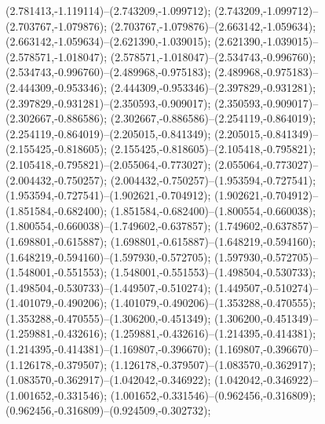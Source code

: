  (2.781413,-1.119114)--(2.743209,-1.099712);
 (2.743209,-1.099712)--(2.703767,-1.079876);
 (2.703767,-1.079876)--(2.663142,-1.059634);
 (2.663142,-1.059634)--(2.621390,-1.039015);
 (2.621390,-1.039015)--(2.578571,-1.018047);
 (2.578571,-1.018047)--(2.534743,-0.996760);
 (2.534743,-0.996760)--(2.489968,-0.975183);
 (2.489968,-0.975183)--(2.444309,-0.953346);
 (2.444309,-0.953346)--(2.397829,-0.931281);
 (2.397829,-0.931281)--(2.350593,-0.909017);
 (2.350593,-0.909017)--(2.302667,-0.886586);
 (2.302667,-0.886586)--(2.254119,-0.864019);
 (2.254119,-0.864019)--(2.205015,-0.841349);
 (2.205015,-0.841349)--(2.155425,-0.818605);
 (2.155425,-0.818605)--(2.105418,-0.795821);
 (2.105418,-0.795821)--(2.055064,-0.773027);
 (2.055064,-0.773027)--(2.004432,-0.750257);
 (2.004432,-0.750257)--(1.953594,-0.727541);
 (1.953594,-0.727541)--(1.902621,-0.704912);
 (1.902621,-0.704912)--(1.851584,-0.682400);
 (1.851584,-0.682400)--(1.800554,-0.660038);
 (1.800554,-0.660038)--(1.749602,-0.637857);
 (1.749602,-0.637857)--(1.698801,-0.615887);
 (1.698801,-0.615887)--(1.648219,-0.594160);
 (1.648219,-0.594160)--(1.597930,-0.572705);
 (1.597930,-0.572705)--(1.548001,-0.551553);
 (1.548001,-0.551553)--(1.498504,-0.530733);
 (1.498504,-0.530733)--(1.449507,-0.510274);
 (1.449507,-0.510274)--(1.401079,-0.490206);
 (1.401079,-0.490206)--(1.353288,-0.470555);
 (1.353288,-0.470555)--(1.306200,-0.451349);
 (1.306200,-0.451349)--(1.259881,-0.432616);
 (1.259881,-0.432616)--(1.214395,-0.414381);
 (1.214395,-0.414381)--(1.169807,-0.396670);
 (1.169807,-0.396670)--(1.126178,-0.379507);
 (1.126178,-0.379507)--(1.083570,-0.362917);
 (1.083570,-0.362917)--(1.042042,-0.346922);
 (1.042042,-0.346922)--(1.001652,-0.331546);
 (1.001652,-0.331546)--(0.962456,-0.316809);
 (0.962456,-0.316809)--(0.924509,-0.302732);
